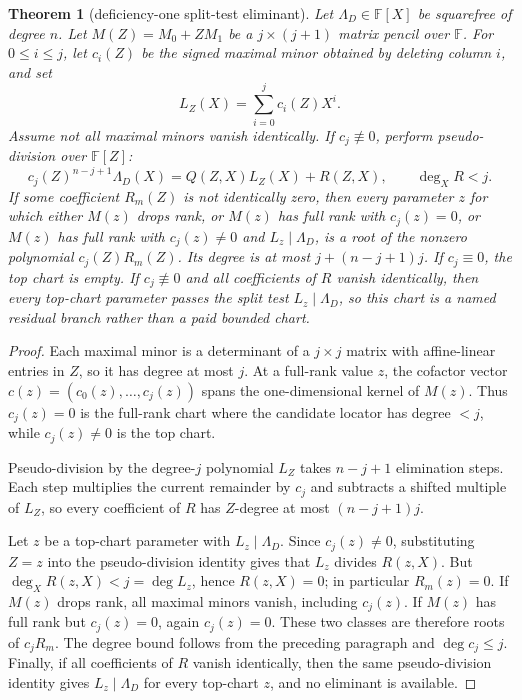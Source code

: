 \documentclass[a4paper,11pt]{amsart}
\newtheorem{theorem}{Theorem}[section]
\theoremstyle{remark}
\newcommand{\F}{\mathbb F}
\begin{document}
\begin{theorem}[deficiency-one split-test eliminant]\label{thm:deficiency-one-eliminant}
Let \(\Lambda_D\in\F[X]\) be squarefree of degree \(n\).  Let \(M(Z)=M_0+ZM_1\) be a \(j\times(j+1)\) matrix pencil over \(\F\).  For \(0\le i\le j\), let \(c_i(Z)\) be the signed maximal minor obtained by deleting column \(i\), and set
\[
        L_Z(X)=\sum_{i=0}^j c_i(Z)X^i .
\]
Assume not all maximal minors vanish identically.  If \(c_j\not\equiv0\), perform pseudo-division over \(\F[Z]\):
\[
        c_j(Z)^{n-j+1}\Lambda_D(X)=Q(Z,X)L_Z(X)+R(Z,X),
        \qquad \deg_XR<j .
\]
If some coefficient \(R_m(Z)\) is not identically zero, then every parameter \(z\) for which either \(M(z)\) drops rank, or \(M(z)\) has full rank with \(c_j(z)=0\), or \(M(z)\) has full rank with \(c_j(z)\ne0\) and \(L_z\mid\Lambda_D\), is a root of the nonzero polynomial \(c_j(Z)R_m(Z)\).  Its degree is at most \(j+(n-j+1)j\).  If \(c_j\equiv0\), the top chart is empty.  If \(c_j\not\equiv0\) and all coefficients of \(R\) vanish identically, then every top-chart parameter passes the split test \(L_z\mid\Lambda_D\), so this chart is a named residual branch rather than a paid bounded chart.
\end{theorem}

\begin{proof}
Each maximal minor is a determinant of a \(j\times j\) matrix with affine-linear entries in \(Z\), so it has degree at most \(j\).  At a full-rank value \(z\), the cofactor vector \(c(z)=(c_0(z),\ldots,c_j(z))\) spans the one-dimensional kernel of \(M(z)\).  Thus \(c_j(z)=0\) is the full-rank chart where the candidate locator has degree \(<j\), while \(c_j(z)\ne0\) is the top chart.

Pseudo-division by the degree-\(j\) polynomial \(L_Z\) takes \(n-j+1\) elimination steps.  Each step multiplies the current remainder by \(c_j\) and subtracts a shifted multiple of \(L_Z\), so every coefficient of \(R\) has \(Z\)-degree at most \((n-j+1)j\).

Let \(z\) be a top-chart parameter with \(L_z\mid\Lambda_D\).  Since \(c_j(z)\ne0\), substituting \(Z=z\) into the pseudo-division identity gives that \(L_z\) divides \(R(z,X)\).  But \(\deg_XR(z,X)<j=\deg L_z\), hence \(R(z,X)=0\); in particular \(R_m(z)=0\).  If \(M(z)\) drops rank, all maximal minors vanish, including \(c_j(z)\).  If \(M(z)\) has full rank but \(c_j(z)=0\), again \(c_j(z)=0\).  These two classes are therefore roots of \(c_jR_m\).  The degree bound follows from the preceding paragraph and \(\deg c_j\le j\).  Finally, if all coefficients of \(R\) vanish identically, then the same pseudo-division identity gives \(L_z\mid\Lambda_D\) for every top-chart \(z\), and no eliminant is available.
\end{proof}
\end{document}
